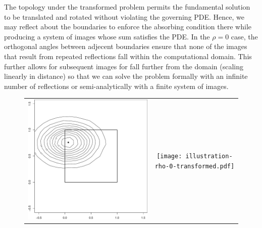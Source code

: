 \documentclass[10pt]{article}
\begin{document}
The topology under the transformed problem permits the fundamental
solution to be translated and rotated without violating the governing
PDE. Hence, we may reflect about the boundaries to enforce the
absorbing condition there while producing a system of images whose sum
satisfies the PDE. In the $\rho=0$ case, the orthogonal angles between
adjecent boundaries ensure that none of the images that result from
repeated reflections fall within the computational domain. This
further allows for subsequent images for fall further from the domain
(scaling linearly in distance) so that we can solve the problem
formally with an infinite number of reflections or semi-analytically
with a finite system of images.
\begin{figure}
  \centering
  \begin{tabular}{cc}
    \begin{minipage}{0.40\textwidth}
      \centering
      \includegraphics[width=1\linewidth]{illustration-rho-0-normalized.pdf}
      \caption{}
      \label{fig:normalized-problem-rho-0}
    \end{minipage}
    & \begin{minipage}{0.40\textwidth}
      \centering
      \texttt{[image: illustration-rho-0-transformed.pdf]}
      \caption{}
      \label{fig:transformed-problem-rho-0}
    \end{minipage}
  \end{tabular}
\end{figure}
\end{document}
